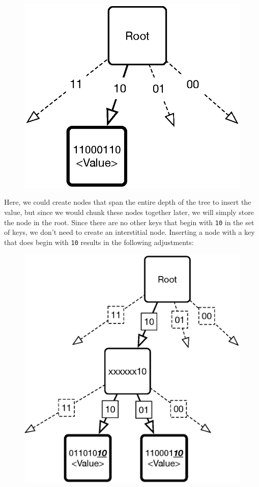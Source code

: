 \documentclass[preprint]{sigplanconf}
\begin{document}
\begin{figure}[H]
\includegraphics[scale=.5]{trie1}
\centering
\end{figure}
Here, we could create nodes that span the entire depth of the tree to insert the value, but since we would chunk these nodes together later, we will simply store the node in the root.
Since there are no other keys that begin with \texttt{10} in the set of keys, we don't need to create an interstitial node.
Inserting a node with a key that does begin with \texttt{10} results in the following adjustments:
\begin{figure}[H]
\includegraphics[scale=.5]{trie2}
\centering
\end{figure}
\end{document}
